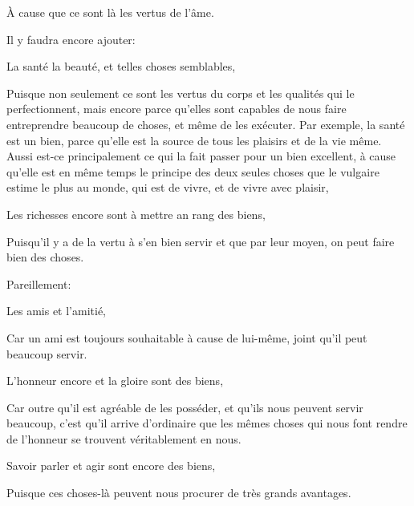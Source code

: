 À cause que ce sont là les vertus de l'âme. 

\bigbreak

Il y faudra encore ajouter:

\begin{emphpar}
     La santé la beauté, et telles choses semblables,
\end{emphpar}

Puisque non seulement ce sont les vertus du corps et les qualités qui le perfectionnent, mais encore parce qu'elles sont capables
de nous faire entreprendre beaucoup de choses, et même de les exécuter. Par exemple, la santé est un bien, parce qu'elle est la
source de tous les plaisirs et de la vie même. Aussi est-ce principalement ce qui la fait passer pour un bien excellent, à cause
qu'elle est en même temps le principe des deux seules choses que le vulgaire estime le plus au monde, qui est de vivre, et de vivre
avec plaisir, 

\bigbreak

\begin{emphpar}
     Les richesses encore sont à mettre an rang des biens, 
\end{emphpar}

Puisqu'il y a de la vertu à s'en bien servir et que par leur moyen, on peut faire bien des choses.

\bigbreak

Pareillement:

\begin{emphpar}
      Les amis et l'amitié,
\end{emphpar}

Car un ami est toujours souhaitable à cause de lui-même, joint qu'il peut beaucoup servir.

\bigbreak

\begin{emphpar}
      L'honneur encore et la gloire sont des biens,
\end{emphpar}

Car outre qu'il est agréable de les posséder, et qu'ils nous peuvent servir beaucoup, c'est qu'il arrive d'ordinaire que les mêmes choses
qui nous font rendre de l'honneur se trouvent véritablement en nous.

\bigbreak

\begin{emphpar}
      Savoir parler et agir sont encore des biens,
\end{emphpar}

Puisque ces choses-là peuvent nous procurer de très grands avantages. 

